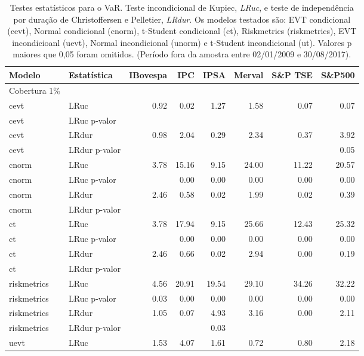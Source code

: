 \begin{longtable}{llrrrrrr}
\caption{Testes estatísticos para o VaR. Teste incondicional de Kupiec, \emph{LRuc}, e teste de
             independência por duração de Christoffersen e Pelletier, \emph{LRdur}. Os modelos testados
são: EVT condicional (cevt), Normal condicional (cnorm), t-Student condicional (ct), Riskmetrics 
(riskmetrics), EVT incondicioanl (uevt), Normal incondicional (unorm) e t-Student incondicional (ut).
Valores p maiores que 0,05 foram omitidos. (Período fora da amostra entre 02/01/2009 e 30/08/2017).} \\ 
  \toprule
Modelo & Estatística & IBovespa & IPC & IPSA & Merval & S\&P TSE & S\&P500 \\ 
  \midrule
Cobertura 1\% &  &  &  &  &  &  &  \\ 
  cevt & LRuc & 0.92 & 0.02 & 1.27 & 1.58 & 0.07 & 0.07 \\ 
  cevt & LRuc p-valor &  &  &  &  &  &  \\ 
  cevt & LRdur & 0.98 & 2.04 & 0.29 & 2.34 & 0.37 & 3.92 \\ 
  cevt & LRdur p-valor &  &  &  &  &  & 0.05 \\ 
  cnorm & LRuc & 3.78 & 15.16 & 9.15 & 24.00 & 11.22 & 20.57 \\ 
  cnorm & LRuc p-valor &  & 0.00 & 0.00 & 0.00 & 0.00 & 0.00 \\ 
  cnorm & LRdur & 2.46 & 0.58 & 0.02 & 1.99 & 0.02 & 0.39 \\ 
  cnorm & LRdur p-valor &  &  &  &  &  &  \\ 
  ct & LRuc & 3.78 & 17.94 & 9.15 & 25.66 & 12.43 & 25.32 \\ 
  ct & LRuc p-valor &  & 0.00 & 0.00 & 0.00 & 0.00 & 0.00 \\ 
  ct & LRdur & 2.46 & 0.66 & 0.02 & 2.94 & 0.00 & 0.19 \\ 
  ct & LRdur p-valor &  &  &  &  &  &  \\ 
  riskmetrics & LRuc & 4.56 & 20.91 & 19.54 & 29.10 & 34.26 & 32.22 \\ 
  riskmetrics & LRuc p-valor & 0.03 & 0.00 & 0.00 & 0.00 & 0.00 & 0.00 \\ 
  riskmetrics & LRdur & 1.05 & 0.07 & 4.93 & 3.16 & 0.00 & 2.11 \\ 
  riskmetrics & LRdur p-valor &  &  & 0.03 &  &  &  \\ 
  uevt & LRuc & 1.53 & 4.07 & 1.61 & 0.72 & 0.80 & 2.18 \\ 

\end{longtable}
